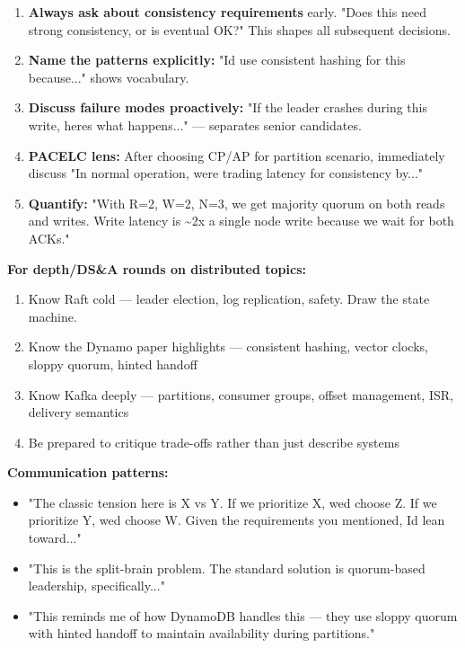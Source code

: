 \documentclass[11pt]{article}
\providecommand{\tightlist}{\setlength{\itemsep}{1pt}\setlength{\parskip}{0pt}}
\begin{document}
\begin{enumerate}
\def\labelenumi{\arabic{enumi}.}
\tightlist
\item
  \textbf{Always ask about consistency requirements} early. "Does this need strong consistency, or is eventual OK?" This shapes all subsequent decisions.
\item
  \textbf{Name the patterns explicitly:} "I\textquotesingle d use consistent hashing for this because..." shows vocabulary.
\item
  \textbf{Discuss failure modes proactively:} "If the leader crashes during this write, here\textquotesingle s what happens..." --- separates senior candidates.
\item
  \textbf{PACELC lens:} After choosing CP/AP for partition scenario, immediately discuss "In normal operation, we\textquotesingle re trading latency for consistency by..."
\item
  \textbf{Quantify:} "With R=2, W=2, N=3, we get majority quorum on both reads and writes. Write latency is \textasciitilde2x a single node write because we wait for both ACKs."
\end{enumerate}

\textbf{For depth/DS\&A rounds on distributed topics:}

\begin{enumerate}
\def\labelenumi{\arabic{enumi}.}
\tightlist
\item
  Know Raft cold --- leader election, log replication, safety. Draw the state machine.
\item
  Know the Dynamo paper highlights --- consistent hashing, vector clocks, sloppy quorum, hinted handoff
\item
  Know Kafka deeply --- partitions, consumer groups, offset management, ISR, delivery semantics
\item
  Be prepared to critique trade-offs rather than just describe systems
\end{enumerate}

\textbf{Communication patterns:}

\begin{itemize}
\tightlist
\item
  "The classic tension here is X vs Y. If we prioritize X, we\textquotesingle d choose Z. If we prioritize Y, we\textquotesingle d choose W. Given the requirements you mentioned, I\textquotesingle d lean toward..."
\item
  "This is the split-brain problem. The standard solution is quorum-based leadership, specifically..."
\item
  "This reminds me of how DynamoDB handles this --- they use sloppy quorum with hinted handoff to maintain availability during partitions."
\end{itemize}
\end{document}

